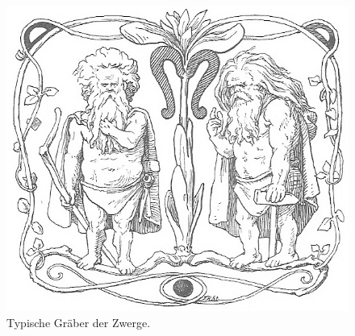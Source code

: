 \begin{figure}
	\centering
	\includegraphics[width=0.7\linewidth]{Abbildungen/Weltenbau/Lebensformen/ZwergGraeber.png}
	\caption{Typische Gräber der Zwerge.}
	\label{fig:zwerggraeber}
\end{figure}

